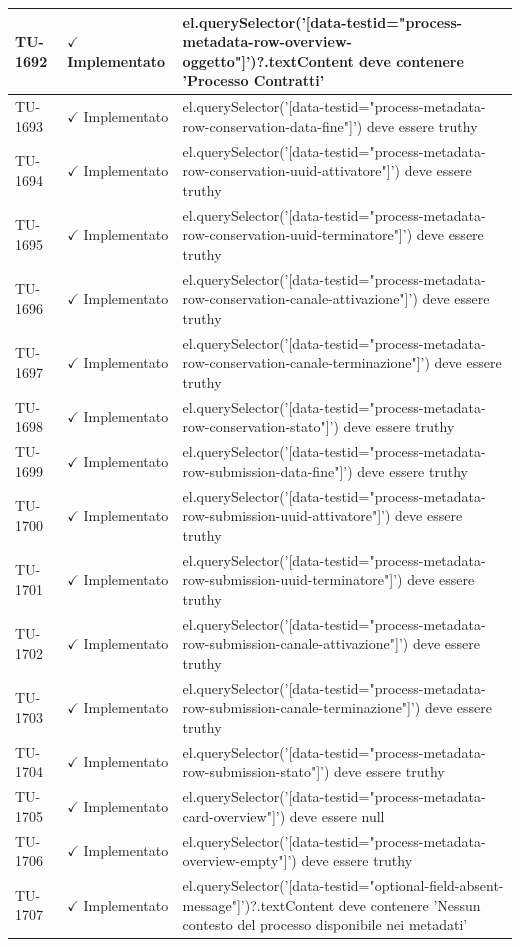 ﻿\documentclass[a4paper,12pt]{article}
\newcommand{\ok}{\textcolor{green!60!black}{$\checkmark$ Implementato}}
\begin{document}
\begin{longtable}{|p{2cm}|p{3.5cm}|p{9.5cm}|}
\hline
TU-1692 & \ok & el.querySelector('[data-testid="process-metadata-row-overview-oggetto"]')?.textContent deve contenere 'Processo Contratti' \\
\hline
TU-1693 & \ok & el.querySelector('[data-testid="process-metadata-row-conservation-data-fine"]') deve essere truthy \\
\hline
TU-1694 & \ok & el.querySelector('[data-testid="process-metadata-row-conservation-uuid-attivatore"]') deve essere truthy \\
\hline
TU-1695 & \ok & el.querySelector('[data-testid="process-metadata-row-conservation-uuid-terminatore"]') deve essere truthy \\
\hline
TU-1696 & \ok & el.querySelector('[data-testid="process-metadata-row-conservation-canale-attivazione"]') deve essere truthy \\
\hline
TU-1697 & \ok & el.querySelector('[data-testid="process-metadata-row-conservation-canale-terminazione"]') deve essere truthy \\
\hline
TU-1698 & \ok & el.querySelector('[data-testid="process-metadata-row-conservation-stato"]') deve essere truthy \\
\hline
TU-1699 & \ok & el.querySelector('[data-testid="process-metadata-row-submission-data-fine"]') deve essere truthy \\
\hline
TU-1700 & \ok & el.querySelector('[data-testid="process-metadata-row-submission-uuid-attivatore"]') deve essere truthy \\
\hline
TU-1701 & \ok & el.querySelector('[data-testid="process-metadata-row-submission-uuid-terminatore"]') deve essere truthy \\
\hline
TU-1702 & \ok & el.querySelector('[data-testid="process-metadata-row-submission-canale-attivazione"]') deve essere truthy \\
\hline
TU-1703 & \ok & el.querySelector('[data-testid="process-metadata-row-submission-canale-terminazione"]') deve essere truthy \\
\hline
TU-1704 & \ok & el.querySelector('[data-testid="process-metadata-row-submission-stato"]') deve essere truthy \\
\hline
TU-1705 & \ok & el.querySelector('[data-testid="process-metadata-card-overview"]') deve essere null \\
\hline
TU-1706 & \ok & el.querySelector('[data-testid="process-metadata-overview-empty"]') deve essere truthy \\
\hline
TU-1707 & \ok & el.querySelector('[data-testid="optional-field-absent-message"]')?.textContent deve contenere 'Nessun contesto del processo disponibile nei metadati' \\

\end{longtable}
\end{document}
